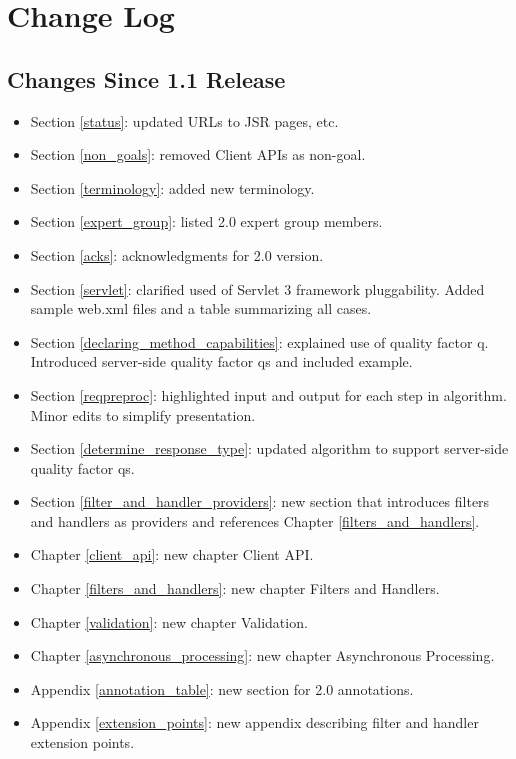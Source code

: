 \chapter{Change Log}


\section{Changes Since 1.1 Release}

\begin{itemize}
\item Section \ref{status}: updated URLs to JSR pages, etc.
\item Section \ref{non_goals}: removed Client APIs as non-goal.
\item Section \ref{terminology}: added new terminology.
\item Section \ref{expert_group}: listed 2.0 expert group members.
\item Section \ref{acks}: acknowledgments for 2.0 version.
\item Section \ref{servlet}: clarified used of Servlet 3 framework pluggability. Added sample web.xml files and a table summarizing all cases.
\item Section \ref{declaring_method_capabilities}: explained use of quality factor q. Introduced server-side quality factor qs and included example.
\item Section \ref{reqpreproc}: highlighted input and output for each step in algorithm. Minor edits to simplify presentation.
\item Section \ref{determine_response_type}: updated algorithm to support server-side quality factor qs.
\item Section \ref{filter_and_handler_providers}: new section that introduces filters and handlers as providers and references Chapter \ref{filters_and_handlers}.
\item Chapter \ref{client_api}: new chapter Client API.
\item Chapter \ref{filters_and_handlers}: new chapter Filters and Handlers.
\item Chapter \ref{validation}: new chapter Validation.
\item Chapter \ref{asynchronous_processing}: new chapter Asynchronous Processing.
\item Appendix \ref{annotation_table}: new section for 2.0 annotations.
\item Appendix \ref{extension_points}: new appendix describing filter and handler extension points.
\end{itemize}

